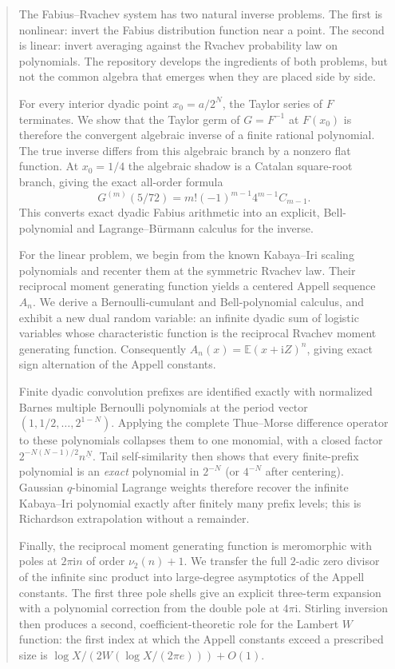 \documentclass[11pt,oneside]{article}
\theoremstyle{frontier}
\theoremstyle{definition}
\theoremstyle{remark}
\newcommand{\ii}{\mathrm i}
\newcommand{\vtwo}{\nu_2}
\newcommand{\fall}[2]{#1^{\underline{#2}}}
\begin{document}
\begin{abstract}
The Fabius--Rvachev system has two natural inverse problems.  The first is nonlinear: invert the
Fabius distribution function near a point.  The second is linear: invert averaging against the
Rvachev probability law on polynomials.  The repository develops the ingredients of both problems,
but not the common algebra that emerges when they are placed side by side.

For every interior dyadic point $x_0=a/2^N$, the Taylor series of $F$ terminates.  We show that the
Taylor germ of $G=F^{-1}$ at $F(x_0)$ is therefore the convergent algebraic inverse of a finite
rational polynomial.  The true inverse differs from this algebraic branch by a nonzero flat function.
At $x_0=1/4$ the algebraic shadow is a Catalan square-root branch, giving the exact all-order formula
\[
 G^{(m)}(5/72)=m!(-1)^{m-1}4^{m-1}C_{m-1}.
\]
This converts exact dyadic Fabius arithmetic into an explicit, Bell-polynomial and
Lagrange--B\"urmann calculus for the inverse.

For the linear problem, we begin from the known Kabaya--Iri scaling polynomials and recenter them
at the symmetric Rvachev law.  Their reciprocal moment generating function yields a centered Appell
sequence $A_n$.  We derive a Bernoulli-cumulant and Bell-polynomial calculus, and exhibit a new
dual random variable: an infinite dyadic sum of logistic variables whose characteristic function is
the reciprocal Rvachev moment generating function.  Consequently
$A_n(x)=\mathbb E(x+\ii Z)^n$, giving exact sign alternation of the Appell constants.

Finite dyadic convolution prefixes are identified exactly with normalized Barnes multiple Bernoulli
polynomials at the period vector $(1,1/2,\ldots,2^{1-N})$.  Applying the complete Thue--Morse
difference operator to these polynomials collapses them to one monomial, with a closed factor
$2^{-N(N-1)/2}\fall nN$.  Tail self-similarity then shows that every finite-prefix polynomial is an
\emph{exact} polynomial in $2^{-N}$ (or $4^{-N}$ after centering).  Gaussian $q$-binomial Lagrange
weights therefore recover the infinite Kabaya--Iri polynomial exactly after finitely many prefix
levels; this is Richardson extrapolation without a remainder.

Finally, the reciprocal moment generating function is meromorphic with poles at $2\pi\ii n$ of
order $\vtwo(n)+1$.  We transfer the full $2$-adic zero divisor of the infinite sinc product into
large-degree asymptotics of the Appell constants.  The first three pole shells give an explicit
three-term expansion with a polynomial correction from the double pole at $4\pi\ii$.  Stirling
inversion then produces a second, coefficient-theoretic role for the Lambert $W$ function: the first
index at which the Appell constants exceed a prescribed size is
$\log X/(2W(\log X/(2\pi e)))+O(1)$.
\end{abstract}
\end{document}
